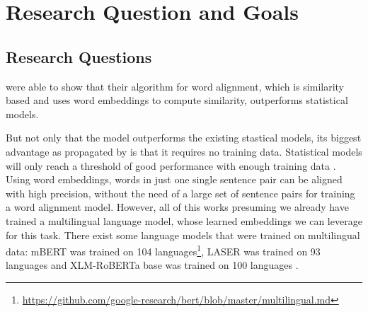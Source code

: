 


\section{Research Question and Goals}
\subsection{Research Questions}
\cite{jalili-sabet-etal-2020-simalign} were able to show that their algorithm for word alignment, which is similarity based and uses word embeddings to compute similarity, outperforms statistical models. 

But not only that the model outperforms the existing stastical models, its biggest advantage as propagated by \cite{jalili-sabet-etal-2020-simalign} is that it requires no training data. 
Statistical models will only reach a threshold of good performance with enough training data \autocites{jalili-sabet-etal-2020-simalign,och-ney-2000-improved}. 
Using word embeddings, words in just one single sentence pair can be aligned with high precision, without the need of a large set of sentence pairs for training a word alignment model.
However, all of this works presuming we already have trained a multilingual language model, whose learned embeddings we can leverage for this task. 
There exist some language models that were trained on multilingual data: 
mBERT was trained on 104 languages\footnote{\url{https://github.com/google-research/bert/blob/master/multilingual.md}}, LASER was trained on 93 languages \autocite{artexte-schwenk-2019-laser} and XLM-RoBERTa base was trained on 100 languages \autocite{conneau-etal-2020-xlm}. 

